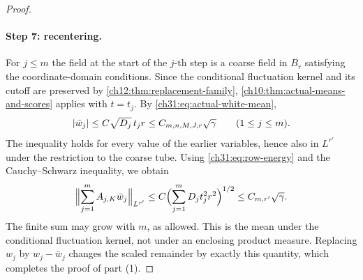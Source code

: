 \begin{proof}
\paragraph{Step 7: recentering.}
For $j\le m$ the field at the start of the $j$-th step is a coarse field in $B_r$ satisfying the coordinate-domain conditions. Since the conditional fluctuation kernel and its cutoff are preserved by \cref{ch12:thm:replacement-family}, \cref{ch10:thm:actual-means-and-scores} applies with $t=t_j$. By \eqref{ch31:eq:actual-white-mean},
\[
 \lvert \bar w_j\rvert\le C\sqrt{D_j}\,t_jr\le C_{m,n,M,J,r}\sqrt\gamma\qquad(1\le j\le m).
\]
The inequality holds for every value of the earlier variables, hence also in $L^{r'}$ under the restriction to the coarse tube. Using \eqref{ch31:eq:row-energy} and the Cauchy--Schwarz inequality, we obtain
\begin{equation}\label{ch31:eq:mean-remainder}
 \Bigl\lVert\sum_{j=1}^mA_{j,K}\bar w_j\Bigr\rVert_{L^{r'}}\le C\Bigl(\sum_{j=1}^mD_jt_j^2r^2\Bigr)^{1/2}\le C_{m,r'}\sqrt\gamma.
\end{equation}
The finite sum may grow with $m$, as allowed. This is the mean under the conditional fluctuation kernel, not under an enclosing product measure. Replacing $w_j$ by $w_j-\bar w_j$ changes the scaled remainder by exactly this quantity, which completes the proof of part (1).


\end{proof}
